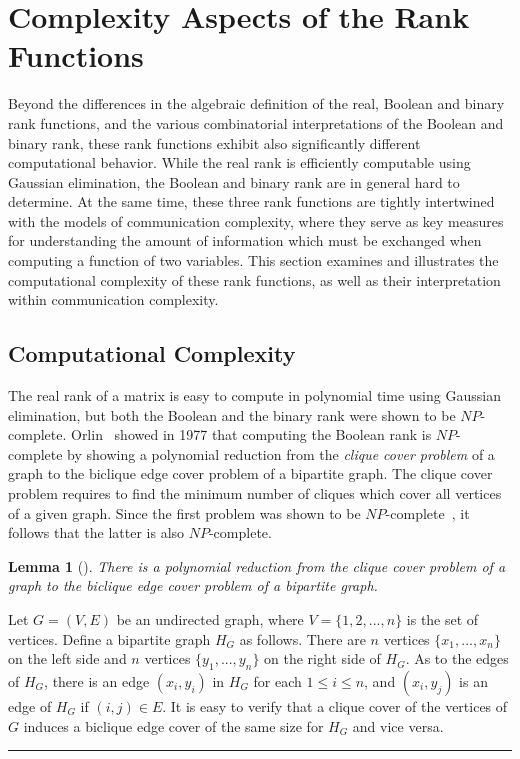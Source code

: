 \documentclass[11pt]{article}
\newtheorem{lemma}[theorem]{Lemma}
\newcommand{\qedsymb}{\hfill{\rule{2mm}{2mm}}}
\renewenvironment{proof}[1][]{\begin{trivlist}
\item[\hspace{\labelsep}{\bf\noindent Proof#1:\/}] }{\qedsymb\end{trivlist}}
\begin{document}
\section{Complexity Aspects of the Rank Functions}

Beyond the differences in the algebraic definition of the real, Boolean and binary rank functions, and the various combinatorial interpretations of the Boolean and binary rank,
these rank functions exhibit also significantly different computational behavior.
While the real rank is efficiently computable using  Gaussian elimination, the Boolean and binary rank are in general hard to determine.
At the same time, these three rank functions are tightly intertwined with the models of communication complexity,
where they serve as key measures for understanding the amount of information which must be exchanged when computing a function of two variables.
This section examines and illustrates the computational complexity of these rank functions,
as well as their interpretation within communication complexity.

\label{Sec-complexity}
\subsection{Computational Complexity}

The real rank of a matrix is  easy to compute in polynomial time using Gaussian elimination,
but both the Boolean and the binary rank were shown to be $NP$-complete.
Orlin~\cite{orlin1977contentment} showed in 1977 that computing the Boolean rank is $NP$-complete by showing a polynomial reduction
from the {\em clique cover problem} of a graph to the biclique edge cover problem of a bipartite graph.
The clique cover problem requires to find the minimum number of cliques which cover all vertices of a given graph.
Since the first problem was shown to be $NP$-complete~\cite{Karp1972}, it follows that the latter is also $NP$-complete.

\begin{lemma}[\cite{orlin1977contentment}]
There is a polynomial reduction from the clique cover problem of a graph to the biclique edge cover problem of a bipartite graph.
\end{lemma}
\begin{proof}
Let $G = (V,E)$ be an undirected graph, where $V = \{1,2,...,n\}$ is the set of vertices.
Define a bipartite graph $H_G $ as follows. There are $n$ vertices $\{x_1,...,x_n\}$ on the left side and $n$ vertices  $\{y_1,...,y_n\}$ on the right side of $H_G$.
As to the edges of $H_G$,
there is an edge $(x_i,y_i)$ in $H_G$ for each $1 \leq i \leq n$,
and $(x_i,y_j)$ is an edge of $H_G$ if $(i,j)\in E$.
It is easy to verify that a clique cover of the vertices of $G$ induces a biclique edge cover of the same size for $H_G$ and vice versa.
\end{proof}
\end{document}
